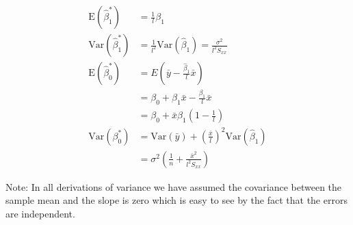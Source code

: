 \documentclass{article}\usepackage[]{graphicx}\usepackage[]{color}
\newcommand{\E}{\mathrm{E}}
\newcommand{\Var}{\mathrm{Var}}
\begin{document}
	
	\begin{align*}
		\E (\hat \beta _1^*) &= \frac{1}{l}\beta_1\\
		\Var (\hat \beta_1 ^*) &= \frac{1}{l^2}\Var(\hat \beta_1) = \frac{\sigma^2}{l^2 S_{xx}}\\
		\E (\hat \beta_0^*) &= E(\bar y - \frac{\hat \beta_1}{l}\bar x )\\
		&= \beta_0 + \beta_1 \bar x - \frac{\beta_1}{l}\bar x\\
		&= \beta_0 + \bar x \beta_1 (1- \frac{1}{l})\\
		\Var(\beta _0^*) &= \Var (\bar y ) + (\frac{\bar x}{l})^2\Var(\hat \beta_1) \\
		&= \sigma^2 \left(\frac{1}{n} + \frac{\bar x^2}{l^2S_{xx}}\right)
	\end{align*}


Note: In all derivations of variance we have assumed the covariance between the sample mean and the slope is zero which is easy to see by the fact that the errors are independent. 
\end{document}
